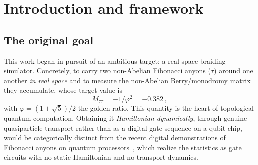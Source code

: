 \documentclass[aps,pra,twocolumn,superscriptaddress,longbibliography,floatfix,nofootinbib]{revtex4-2}
\begin{document}
\begin{abstract}
work --- Francuz and Dziarmaga obtained them for this model in 2020; new here
are the finite-lattice demonstration of the rotation channel, the quantified
error budget, and the measured loop-algebra limit as a concrete instance of the
Li--Mong bound. Complementing this static certificate, we show that on the
one-dimensionally mapped anyonic ladder the Hamiltonian transport of a single
mobile Ising anyon around a pinned object cannot realize the non-Abelian braid
matrix: the closed-loop holonomy is exactly the identity and
$[U(C_1),U(C_2)]=0$, established through two independent obstructions, three
null escape routes, and a machinery-alive control. That obstruction is
structural and independent of both the anyon type and the system size, so it
constrains the Fibonacci ambition motivating this work and not merely the Ising
tracer that exhibits it. Both halves were produced under an adversarial
verification harness that, in the course of this work, retracted an attribution of its own ---
crediting the lattice with the signed data before a channel existed to carry it --- and then
restored it with proof through the rotation channel. The values were never in question, only
their provenance.
\end{abstract}

\maketitle

\section{Introduction and framework}
\label{sec:intro}

\subsection{The original goal}
\label{sec:goal}

This work began in pursuit of an ambitious target: a real-space braiding
simulator. Concretely, to carry two non-Abelian Fibonacci anyons ($\tau$)
around one another \emph{in real space} and to measure the non-Abelian
Berry/monodromy matrix they accumulate, whose target value is
\begin{equation}
  M_{\tau\tau} = -1/\varphi^{2} = -0.382\,,
  \label{eq:target}
\end{equation}
with $\varphi=(1+\sqrt5)/2$ the golden ratio. This quantity is the heart of
topological quantum computation. Obtaining it \emph{Hamiltonian-dynamically},
through genuine quasiparticle transport rather than as a digital gate sequence
on a qubit chip, would be categorically distinct from the recent digital
demonstrations of Fibonacci anyons on quantum processors~\cite{Xu2024}, which
realize the statistics as gate circuits with no static Hamiltonian and no
transport dynamics.
\end{document}
